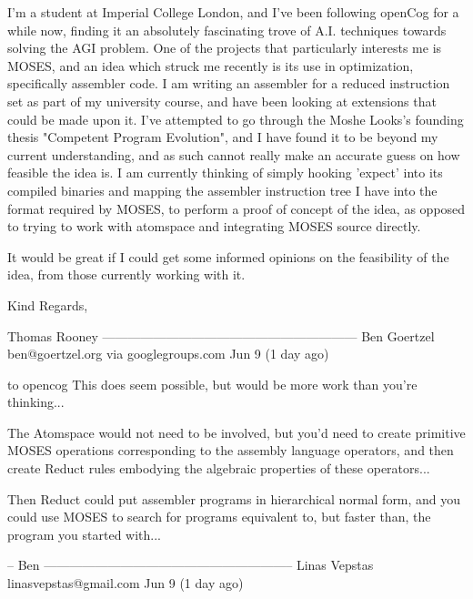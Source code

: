 \documentclass[11pt]{article}
\begin{document}
I'm a student at Imperial College London, and I've been following
openCog for a while now, finding it an absolutely fascinating trove of A.I. techniques towards solving the AGI problem. One of the projects that particularly interests me is MOSES, and an idea which struck me recently is its use in optimization, specifically assembler code. 
I am writing an assembler for a reduced instruction set as part of my university course, and have been looking at extensions that could be made upon it. I've attempted to go through the Moshe Looks's founding thesis "Competent Program Evolution", and I have found it to be beyond my current understanding, and as such cannot really make an accurate guess on how feasible the idea is. I am currently thinking of simply hooking 'expect' into its compiled binaries and mapping the assembler instruction tree I have into the format required by MOSES, to perform a proof of concept of the idea, as opposed to trying to work with atomspace and integrating MOSES source directly.

It would be great if I could get some informed opinions on the feasibility of the idea, from those currently working with it.

Kind Regards,

Thomas Rooney
------------------------------------------------------------
Ben Goertzel ben@goertzel.org via googlegroups.com 
Jun 9 (1 day ago)

to opencog 
This does seem possible, but would be more work than you're thinking...

The Atomspace would not need to be involved, but you'd need to create
primitive MOSES operations corresponding to the assembly language
operators, and then create Reduct rules embodying the algebraic
properties of these operators...

Then Reduct could put assembler programs in hierarchical normal form,
and you could use MOSES to search for programs equivalent to, but
faster than, the program you started with...

-- Ben
-----------------------------------------------------------
Linas Vepstas linasvepstas@gmail.com
Jun 9 (1 day ago)
\end{document}
